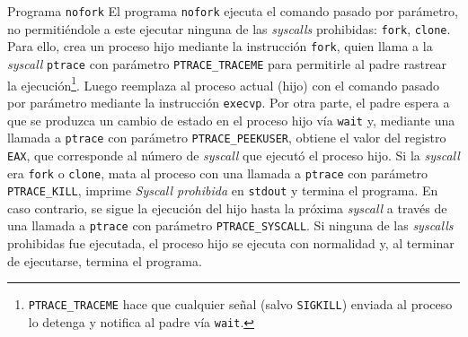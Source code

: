 \documentclass[12pt,titlepage]{article}
\newcommand{\cmd}[1]{\texttt{#1}}
\newcommand{\code}[1]{\texttt{#1}}
\newcommand{\kw}[1]{{\em #1}}
\begin{document}
\begin{section}{Programa \cmd{nofork}}
	El programa \code{nofork} ejecuta el comando pasado por	parámetro, no permitiéndole a este ejecutar ninguna de las \kw{syscalls} prohibidas: \code{fork}, \code{clone}. Para ello, crea un proceso hijo mediante la instrucción \code{fork}, quien llama a la \kw{syscall} \code{ptrace} con parámetro \code{PTRACE\_TRACEME} para permitirle al padre rastrear la ejecución\footnote{\code{PTRACE\_TRACEME} hace que cualquier señal (salvo \code{SIGKILL}) enviada al proceso lo detenga y notifica al padre vía \code{wait}.}. Luego reemplaza al proceso actual (hijo) con el comando pasado por parámetro mediante la instrucción \code{execvp}. Por otra parte, el padre espera a que se produzca un cambio de estado en el proceso hijo vía \code{wait} y, mediante una llamada a \code{ptrace} con parámetro \code{PTRACE\_PEEKUSER}, obtiene el valor del registro \code{EAX}, que corresponde al número de \kw{syscall} que ejecutó el proceso hijo. Si la \kw{syscall} era \code{fork} o \code{clone}, mata al proceso con una llamada a \code{ptrace} con parámetro \code{PTRACE\_KILL}, imprime \kw{Syscall prohibida} en \code{stdout} y termina el programa. En caso contrario, se sigue la ejecución del hijo hasta la próxima \kw{syscall} a través de una llamada a \code{ptrace} con parámetro \code{PTRACE\_SYSCALL}. Si ninguna de las \kw{syscalls} prohibidas fue ejecutada, el proceso hijo se ejecuta con normalidad y, al terminar de ejecutarse, termina el programa.
\end{section}
\end{document}
